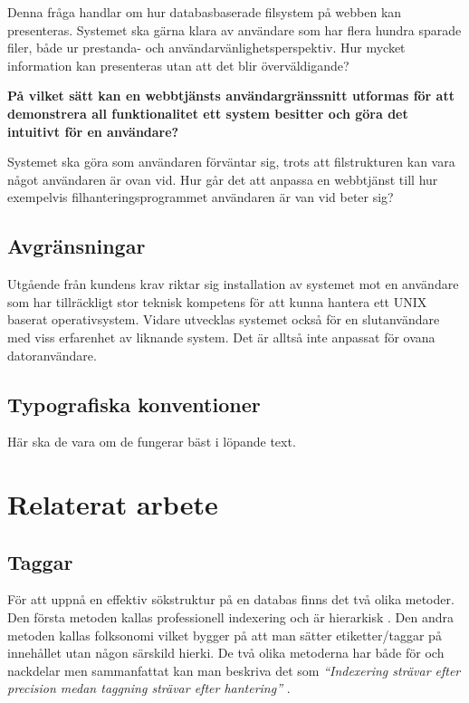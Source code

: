 \documentclass[a4paper,12pt,oneside,final]{extbook}
\begin{document}
Denna fråga handlar om hur databasbaserade filsystem på webben kan presenteras. Systemet ska gärna klara av användare som har flera hundra sparade filer, både ur prestanda- och användarvänlighetsperspektiv. Hur mycket information kan presenteras utan att det blir överväldigande?

\textbf{På vilket sätt kan en webbtjänsts användargränssnitt utformas för att demonstrera all funktionalitet ett system besitter och göra det intuitivt för en användare?}

Systemet ska göra som användaren förväntar sig, trots att filstrukturen kan vara något användaren är ovan vid. Hur går det att anpassa en webbtjänst till hur exempelvis filhanteringsprogrammet användaren är van vid beter sig?

\section{Avgränsningar}
Utgående från kundens krav riktar sig installation av systemet mot en användare som har tillräckligt stor teknisk kompetens för att kunna hantera ett UNIX baserat operativsystem. Vidare utvecklas systemet också för en slutanvändare med viss erfarenhet av liknande system. Det är alltså inte anpassat för ovana datoranvändare.

\section{Typografiska konventioner}
Här ska de vara om de fungerar bäst i löpande text.

\chapter{Relaterat arbete}

\section{Taggar}
För att uppnå en effektiv sökstruktur på en databas finns det två olika metoder. Den första metoden kallas professionell indexering och är hierarkisk \cite{tagging}. Den andra metoden kallas folksonomi vilket bygger på att man sätter etiketter/taggar på innehållet utan någon särskild hierki\cite{tagging}. De två olika metoderna har både för och nackdelar men sammanfattat kan man beskriva det som \textit{“Indexering strävar efter precision medan taggning strävar efter hantering”} \cite{tagging}.
\end{document}

